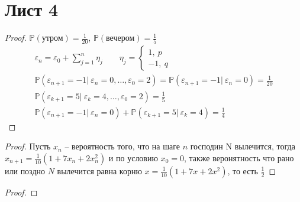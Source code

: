 \section{Лист 4}
    \begin{prob}
    \end{prob}
    \begin{proof}
        $\mathbb{P}(\text{утром}) = \frac{1}{20}$, $\mathbb{P}(\text{вечером}) = \frac{1}{5}$
        \begin{gather*}
            \varepsilon_{n} = \varepsilon_{0} + \sum\limits_{j = 1}^{n} \eta_{j}\qquad
            \eta_{j} =
            \begin{cases}
                1,\ p\\
                -1,\ q
            \end{cases}\\
            \mathbb{P}(\varepsilon_{n+1} = -1|\ \varepsilon_{n} = 0, \ldots, \varepsilon_{0} = 2)
            = \mathbb{P}(\varepsilon_{n+1} = -1|\ \varepsilon_{n} = 0)
            = \frac{1}{20}\\
            \mathbb{P}(\varepsilon_{k+1} = 5|\ \varepsilon_{k} = 4, \ldots, \varepsilon_{0} = 2) = \frac{1}{5}\\
            \mathbb{P}(\varepsilon_{n+1} = -1|\ \varepsilon_{n} = 0) + \mathbb{P}(\varepsilon_{k+1} = 5|\ \varepsilon_{k} = 4)
            = \frac{1}{4}
        \end{gather*}
    \end{proof}
\vskip 0.6in


 
    \begin{prob}
    \end{prob}
    \begin{proof}
        Пусть $x_{n}$ -- вероятность того, что на шаге $n$ господин N вылечится, тогда $x_{n+1} = \frac{1}{10} (1 + 7 x_{n} + 2 x_{n}^2)$ и по  условию $x_{0} = 0$, также веронятность что рано или поздно $N$ вылечится равна корню $x = \frac{1}{10} (1 + 7 x + 2 x^2)$, то есть $\frac{1}{2}$
    \end{proof}
\vskip 0.6in


 
    \begin{prob}
    \end{prob}
    \begin{proof}
    \end{proof}
\vskip 0.6in


 